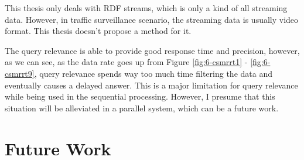 This thesis only deals with RDF streams, which is only a kind of all streaming data.
However, in traffic surveillance scenario, the streaming data is usually video format. 
This thesis doesn't propose a method for it. 

The query relevance is able to provide good response time and precision, however, as we can see, as the data rate goes up from Figure \ref{fig:6-csmrrt1} - \ref{fig:6-csmrrt9}, query relevance spends way too much time filtering the data and eventually causes a delayed answer. 
This is a major limitation for query relevance while being used in the sequential processing. 
However, I presume that this situation will be alleviated in a parallel system, which can be a future work. 
%
\section{Future Work}




